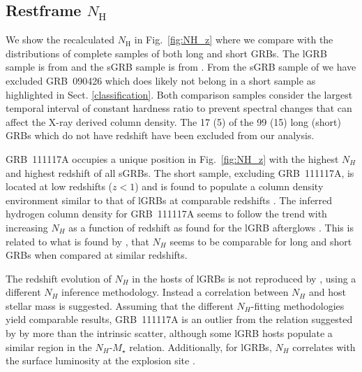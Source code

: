 \documentclass{aa}    %
\begin{document}
\subsection{Restframe $N_\mathrm{H}$} \label{restnH}

We show the recalculated $N_\mathrm{H}$ in Fig.~\ref{fig:NH_z} where we compare
with the distributions of complete samples of both long and short GRBs. The lGRB
sample is from \citet{Arcodia2016} and the sGRB sample is from
\citet{DAvanzo2014a}. From the sGRB sample of \citet{DAvanzo2014a} we have
excluded GRB~090426 which does likely not belong in a short sample as highlighted in
Sect. \ref{classification}. Both comparison samples consider the largest
temporal interval of constant hardness ratio to prevent spectral changes that
can affect the X-ray derived column density. The 17 (5) of the 99 (15) long
(short) GRBs which do not have redshift have been excluded from our analysis.

GRB~111117A occupies a unique position in Fig.~\ref{fig:NH_z} with the highest
$N_H$ and highest redshift of all sGRBs. The short sample, excluding
GRB~111117A, is located at low redshifts ($z < 1$) and is found to populate a
column density environment similar to that of lGRBs at comparable redshifts
\citep{DAvanzo2014a}. The inferred hydrogen column density for GRB~111117A seems
to follow the trend with increasing $N_H$ as a function of redshift as found for
the lGRB afterglows \citep{Campana2010, Starling2013, Arcodia2016}. This is
related to what is found by \citet{Kopac2012, Margutti2013}, that $N_H$ seems to
be comparable for long and short GRBs when compared at similar redshifts.

The redshift evolution of $N_H$ in the hosts of lGRBs is not reproduced by
\citet{Buchner2017}, using a different $N_H$ inference methodology. Instead a
correlation between $N_H$ and host stellar mass is suggested. Assuming that the
different $N_H$-fitting methodologies yield comparable results, GRB~111117A is
an outlier from the relation suggested by \citet{Buchner2017} by more than the
intrinsic scatter, although some lGRB hosts populate a similar region in the
$N_H$-$M_\star$ relation. Additionally, for lGRBs, $N_H$ correlates with the
surface luminosity at the explosion site \citep{Lyman2017}. 
\end{document}
